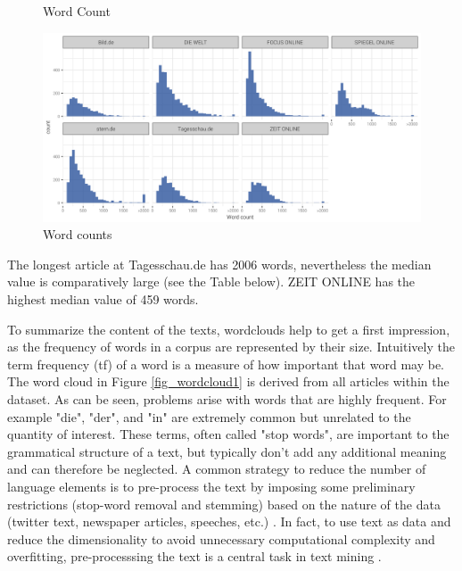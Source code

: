\documentclass[12pt,a4paper,notitlepage]{article}
\begin{document}
\begin{figure}[H]
	\caption{Word Count}
	\begin{center}
		\includegraphics[width=\textwidth]{../figs/wordcount.png}
		\caption{Word counts}
		\label{fig_wordcount}
	\end{center}
\end{figure}

The longest article at Tagesschau.de has 2006 words, nevertheless the median value is comparatively large (see the Table below). ZEIT ONLINE has the highest median value of 459 words. 



To summarize the content of the texts, wordclouds help to get a first impression, as the frequency of words in a corpus are represented by their size. Intuitively the term frequency (tf) of a word is a measure of how important that word may be. The word cloud in Figure \ref{fig_wordcloud1} is derived from all articles within the dataset. As can be seen, problems arise with words that are highly frequent. For example "die", "der", and "in" are extremely common but unrelated to the quantity of interest. These terms, often called "stop words", are important to the grammatical structure of a text, but typically don't add any additional meaning and can therefore be neglected. A common strategy to reduce the number of language elements is to pre-process the text by imposing some preliminary restrictions (stop-word removal and stemming) based on the nature of the data (twitter text, newspaper articles, speeches, etc.) \citep{gentzkow_text_2017}. In fact, to use text as data and reduce the dimensionality to avoid unnecessary computational complexity and overfitting, pre-processsing the text is a central task in text mining \citep{bholat_text_2015}.  
\end{document}
